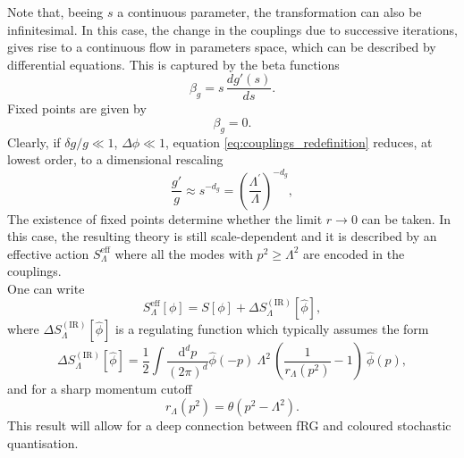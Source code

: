 Note that, beeing $s$ a continuous parameter, the transformation can also be infinitesimal. In this case, the change in the couplings due to successive iterations, gives rise to a continuous flow in parameters space, which can be described by differential equations. This is captured by the beta functions 
\begin{equation*}
    \beta_g = s \, \frac{dg'(s)}{ds}.
\end{equation*}
Fixed points are given by 
\begin{equation*}
    \beta_g = 0.
\end{equation*}
Clearly, if $\delta g / g \ll 1$, $\Delta \phi \ll 1$, equation \eqref{eq:couplings_redefinition} reduces, at lowest order, to a dimensional rescaling
\begin{equation*}
    \frac{g'}{g} \approx s^{-d_g} = \left(\frac{\Lambda^\prime}{\Lambda}\right)^{-d_g},
\end{equation*}
The existence of fixed points determine whether the limit $r \to 0$ can be taken. In this case, the resulting theory is still scale-dependent and it is described by an effective action $S^\text{eff}_\Lambda$ where all the modes with $p^2 \geq \Lambda^2$ are encoded in the couplings. \\
One can write 
\begin{equation*}
    S^\text{eff}_\Lambda[\phi] = S[\phi] + \Delta S_{\Lambda}^{(\mathrm{IR})}[\hat{\phi}],
\end{equation*}
where $\Delta S_{\Lambda}^{(\mathrm{IR})}[\hat{\phi}]$ is a regulating function which typically assumes the form
\begin{equation} 
    \Delta S_{\Lambda}^{(\mathrm{IR})}[\hat{\phi}] = \frac{1}{2} \int \frac{\mathrm{d}^d p}{(2 \pi)^d} \hat{\phi}(-p) \ \Lambda^2 \, \left(\frac{1}{r_{\Lambda}(p^2)}-1\right) \ \hat{\phi}(p),
\end{equation}
and for a sharp momentum cutoff 
\begin{equation*}
    r_{\Lambda}(p^2) = \theta\left(p^2-\Lambda^2\right).
\end{equation*}
This result will allow for a deep connection between fRG and coloured stochastic quantisation.


